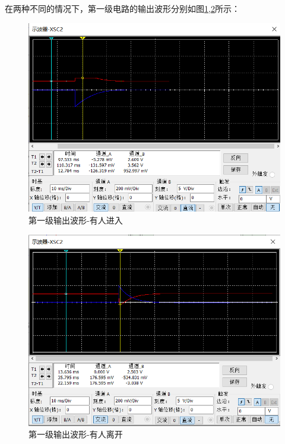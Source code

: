 \documentclass{article}
\begin{document}
\begin{spacing}{1.5}
    在两种不同的情况下，第一级电路的输出波形分别如图\ref{fig:sim4_result5},\ref{fig:sim4_result4}所示：

    \begin{figure}[H]
        \centering
        \includegraphics[scale=0.4]{fig/sim/sim4_result5.png}
        \caption{第一级输出波形-有人进入}
        \label{fig:sim4_result5}
    \end{figure}

    \begin{figure}[H]
        \centering
        \includegraphics[scale=0.4]{fig/sim/sim4_result4.png}
        \caption{第一级输出波形-有人离开}
        \label{fig:sim4_result4}
    \end{figure}


\end{spacing}
\end{document}
